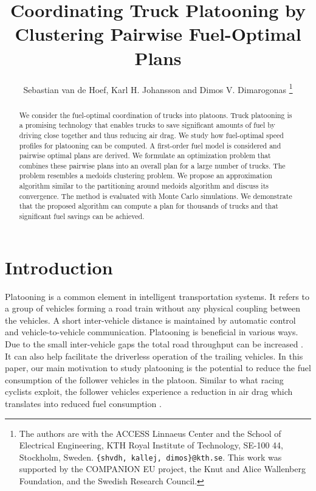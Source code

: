 \documentclass[letterpaper,10pt,conference,twocolumn]{IEEEtran}
\theoremstyle{definition}
\begin{document}
              


\title{Coordinating Truck Platooning by Clustering Pairwise Fuel-Optimal Plans}
\author{Sebastian van de Hoef, Karl H. Johansson and Dimos V. Dimarogonas
\thanks{The authors are with the ACCESS Linnaeus Center and the School of Electrical Engineering, KTH Royal Institute of Technology, SE-100 44, Stockholm, Sweden. {\tt \{shvdh, kallej, dimos\}@kth.se}. This work was supported by the COMPANION EU project, the Knut and Alice Wallenberg Foundation, and the Swedish Research Council.
}
}


\maketitle                    

\begin{abstract}
 We consider the fuel-optimal coordination of trucks into platoons. Truck platooning is a promising technology that enables trucks to save significant amounts of fuel by driving close together and thus reducing air drag. We study how fuel-optimal speed profiles for platooning can be computed. A first-order fuel model is considered and pairwise optimal plans are derived. We formulate an optimization problem that combines these pairwise plans into an overall plan for a large number of trucks. The problem resembles a medoids clustering problem. We propose an approximation algorithm similar to the partitioning around medoids algorithm and discuss its convergence. The method is evaluated with Monte Carlo simulations. We demonstrate that the proposed algorithm can compute a plan for thousands of trucks and that significant fuel savings can be achieved.
\end{abstract}

\section{Introduction}

Platooning is a common element in intelligent transportation systems. It refers to a group of vehicles forming a road train without any physical coupling between the vehicles. A short inter-vehicle distance is maintained by automatic control and vehicle-to-vehicle communication. 
Platooning is beneficial in various ways. Due to the small inter-vehicle gaps the total road throughput can be increased \cite{path_overview_conference}. It can also help facilitate the driverless operation of the trailing vehicles. 
In this paper, our main motivation to study platooning is the potential to reduce the fuel consumption of the follower vehicles in the platoon.  
Similar to what racing cyclists exploit, the follower vehicles experience a reduction in air drag which translates into reduced fuel consumption \cite{Bonnet2000}. 
\end{document}
